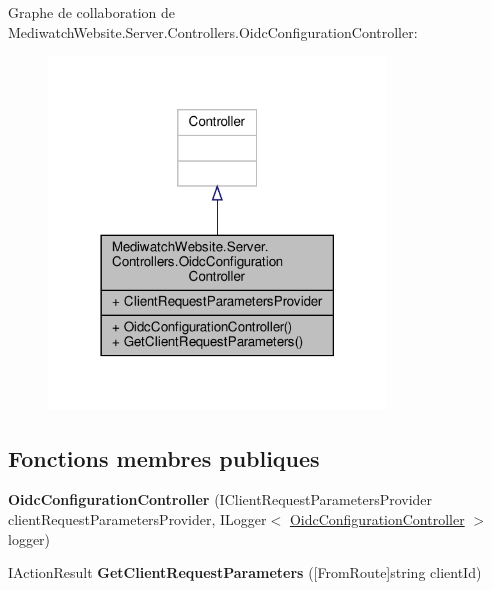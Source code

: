 Graphe de collaboration de Mediwatch\+Website.\+Server.\+Controllers.\+Oidc\+Configuration\+Controller\+:\nopagebreak
\begin{figure}[H]
\begin{center}
\leavevmode
\includegraphics[width=254pt]{class_mediwatch_website_1_1_server_1_1_controllers_1_1_oidc_configuration_controller__coll__graph}
\end{center}
\end{figure}
\subsection*{Fonctions membres publiques}
\begin{DoxyCompactItemize}
\item 
\mbox{\label{class_mediwatch_website_1_1_server_1_1_controllers_1_1_oidc_configuration_controller_a8ba9e64456832ebf3dc0dbc74385affb}} 
{\bfseries Oidc\+Configuration\+Controller} (I\+Client\+Request\+Parameters\+Provider client\+Request\+Parameters\+Provider, I\+Logger$<$ \hyperlink{class_mediwatch_website_1_1_server_1_1_controllers_1_1_oidc_configuration_controller}{Oidc\+Configuration\+Controller} $>$ logger)
\item 
\mbox{\label{class_mediwatch_website_1_1_server_1_1_controllers_1_1_oidc_configuration_controller_afdb4efd2bdc21800cb6380cb1c8df1bf}} 
I\+Action\+Result {\bfseries Get\+Client\+Request\+Parameters} (\mbox{[}From\+Route\mbox{]}string client\+Id)
\end{DoxyCompactItemize}
